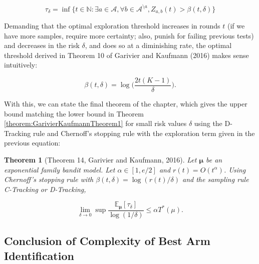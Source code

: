 \documentclass[12pt,]{article}
\newtheorem{theorem}{Theorem}
\begin{document}
\begin{equation*}
\tau_{\delta} = \inf \{t \in \mathbb{N}: \exists a \in \mathcal{A}, \forall b\in \mathcal{A}^{\setminus a}, Z_{a,b}(t) > \beta(t, \delta)\}
\end{equation*}

Demanding that the optimal exploration threshold increases in rounds
\(t\) (if we have more samples, require more certainty; also, punish for
failing previous tests) and decreases in the risk \(\delta\), and does
so at a diminishing rate, the optimal threshold derived in Theorem 10 of
Garivier and Kaufmann (2016) makes sense intuitively:

\begin{equation*}
\beta(t, \delta) = \log \Big(\frac{2t(K-1)}{\delta}\Big).
\end{equation*}

With this, we can state the final theorem of the chapter, which gives
the upper bound matching the lower bound in Theorem
\ref{theorem:GarivierKaufmannTheorem1} for small risk values \(\delta\)
using the D-Tracking rule and Chernoff's stopping rule with the
exploration term given in the previous equation:

\begin{theorem}[Theorem 14, Garivier and Kaufmann, 2016] \label{theorem:GarivierAndKaufmannTheorem14}
Let $\bm{\mu}$ be an exponential family bandit model. Let $\alpha \in [1, e/2]$ and $r(t) = O(t^{\alpha})$. Using Chernoff's stopping rule with $\beta(t,\delta) = \log(r(t)/\delta)$ and the sampling rule C-Tracking or D-Tracking,

\begin{equation*}
\lim_{\delta \to 0} \sup \frac{\mathbb{E}_{\bm{\mu}}[\tau_{\delta}]}{\log(1/\delta)} \leq \alpha T^*(\mu).
\end{equation*}
\end{theorem}

\subsection{Conclusion of Complexity of Best Arm
Identification}\label{conclusion-of-complexity-of-best-arm-identification}
\end{document}
